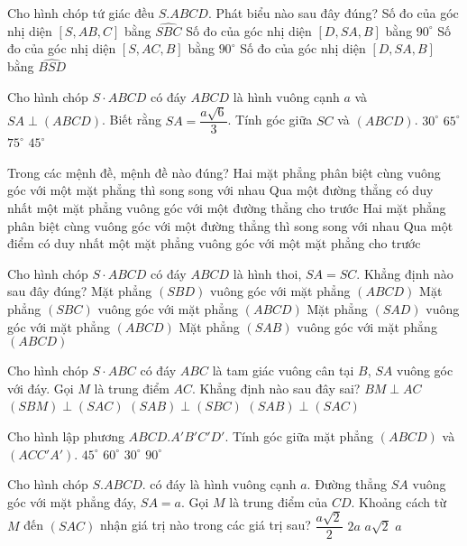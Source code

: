\begin{ex}
Cho hình chóp tứ giác đều $S.ABCD$. Phát biểu nào sau đây đúng?
\choice
{Số đo của góc nhị diện $\left[S, AB, C\right]$ bằng $\widehat{SBC}$}
{Số đo của góc nhị diện $\left[D, SA, B\right]$ bằng ${{90}^{\circ }}$}
{Số đo của góc nhị diện $\left[S, AC, B\right]$ bằng ${{90}^{\circ }}$}
{Số đo của góc nhị diện $\left[D, SA, B\right]$ bằng $\widehat{BSD}$}
\end{ex}
\begin{ex}
Cho hình chóp $S \cdot ABCD$ có đáy $ABCD$ là hình vuông cạnh $a$ và $SA\perp (ABCD)$. Biết rằng $SA=\dfrac{a\sqrt{6}}{3}$. Tính góc giữa $SC$ và $(ABCD)$.
\choice
{$30^\circ $}
{$65^\circ $}
{$75^\circ $}
{$45^\circ $}
\end{ex}
\begin{ex}
Trong các mệnh đề, mệnh đề nào đúng?
\choice
{Hai mặt phẳng phân biệt cùng vuông góc với một mặt phẳng thì song song với nhau}
{Qua một đường thẳng có duy nhất một mặt phẳng vuông góc với một đường thẳng cho trước}
{Hai mặt phẳng phân biệt cùng vuông góc với một đường thẳng thì song song với nhau}
{Qua một điểm có duy nhất một mặt phẳng vuông góc với một mặt phẳng cho trước}
\end{ex}
\begin{ex}
Cho hình chóp $S \cdot ABCD$ có đáy $ABCD$ là hình thoi, $SA=SC$. Khẳng định nào sau đây đúng?
\choice
{Mặt phẳng $(SBD)$ vuông góc với mặt phẳng $(ABCD)$}
{Mặt phẳng $(SBC)$ vuông góc với mặt phẳng $(ABCD)$}
{Mặt phẳng $(SAD)$ vuông góc với mặt phẳng $(ABCD)$}
{Mặt phẳng $(SAB)$ vuông góc với mặt phẳng $(ABCD)$}
\end{ex}
\begin{ex}
Cho hình chóp $S \cdot ABC$ có đáy $ABC$ là tam giác vuông cân tại $B$, $SA$ vuông góc với đáy. Gọi $M$ là trung điểm $AC$. Khẳng định nào sau đây sai?
\choice
{$BM\perp AC$}
{$(SBM)\perp (SAC)$}
{$(SAB)\perp (SBC)$}
{$(SAB)\perp (SAC)$}
\end{ex}
\begin{ex}
Cho hình lập phương $ABCD.A'B'C'D'$. Tính góc giữa mặt phẳng $(ABCD)$ và $\left(ACC'A'\right)$.
\choice
{${{45}^{\circ }}$}
{${{60}^{\circ }}$}
{${{30}^{\circ }}$}
{${{90}^{\circ }}$}
\end{ex}
\begin{ex}
Cho hình chóp $S.ABCD$. có đáy là hình vuông cạnh $a$. Đường thẳng $SA$ vuông góc với mặt phẳng đáy, $SA = a$. Gọi $M$ là trung điểm của $CD$. Khoảng cách từ $M$ đến $(SAC)$ nhận giá trị nào trong các giá trị sau?
\choice
{$\dfrac{a\sqrt{2}}{2}$}
{$2a$ }
{$a\sqrt{2}$ }
{$a$ }
\end{ex}
